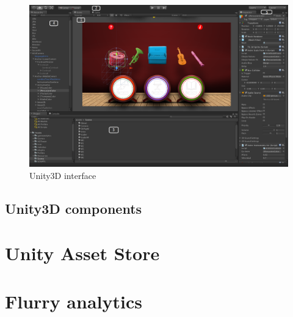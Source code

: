 \begin{figure}[h]
\centering
\includegraphics[width=450pt]{graphics/enabling-tech/unity_interface_general.png}
\caption{Unity3D interface}
\label{fig:unity_interface_general}
\end{figure}

\subsection{Unity3D components}
\label{subsec:unitycomponents}

\section{Unity Asset Store}
\label{sec:assetstore}


\section{Flurry analytics}
\label{sec:flurry}
